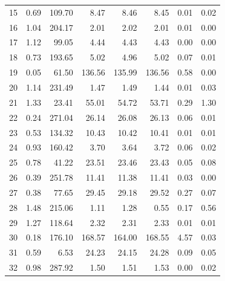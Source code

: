 \documentclass[11pt,a4paper]{article}
\begin{document}
\begin{table}[p]
\begin{tabular}{r r r r r r r r}
15 & 0.69 & 109.70 & 8.47 & 8.46 & 8.45 & 0.01 & 0.02 \\
16 & 1.04 & 204.17 & 2.01 & 2.02 & 2.01 & 0.01 & 0.00 \\
17 & 1.12 & 99.05 & 4.44 & 4.43 & 4.43 & 0.00 & 0.00 \\
18 & 0.73 & 193.65 & 5.02 & 4.96 & 5.02 & 0.07 & 0.01 \\
19 & 0.05 & 61.50 & 136.56 & 135.99 & 136.56 & 0.58 & 0.00 \\
20 & 1.14 & 231.49 & 1.47 & 1.49 & 1.44 & 0.01 & 0.03 \\
21 & 1.33 & 23.41 & 55.01 & 54.72 & 53.71 & 0.29 & 1.30 \\
22 & 0.24 & 271.04 & 26.14 & 26.08 & 26.13 & 0.06 & 0.01 \\
23 & 0.53 & 134.32 & 10.43 & 10.42 & 10.41 & 0.01 & 0.01 \\
24 & 0.93 & 160.42 & 3.70 & 3.64 & 3.72 & 0.06 & 0.02 \\
25 & 0.78 & 41.22 & 23.51 & 23.46 & 23.43 & 0.05 & 0.08 \\
26 & 0.39 & 251.78 & 11.41 & 11.38 & 11.41 & 0.03 & 0.00 \\
27 & 0.38 & 77.65 & 29.45 & 29.18 & 29.52 & 0.27 & 0.07 \\
28 & 1.48 & 215.06 & 1.11 & 1.28 & 0.55 & 0.17 & 0.56 \\
29 & 1.27 & 118.64 & 2.32 & 2.31 & 2.33 & 0.01 & 0.01 \\
30 & 0.18 & 176.10 & 168.57 & 164.00 & 168.55 & 4.57 & 0.03 \\
31 & 0.59 & 6.53 & 24.23 & 24.15 & 24.28 & 0.09 & 0.05 \\
32 & 0.98 & 287.92 & 1.50 & 1.51 & 1.53 & 0.00 & 0.02 \\
\bottomrule
\end{tabular}
\end{table}
\end{document}
